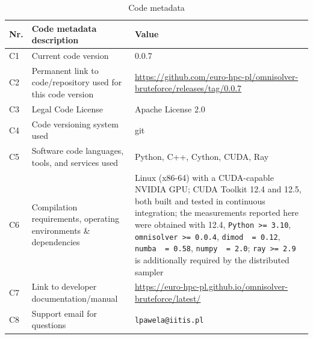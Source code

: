 \documentclass[12pt,a4paper]{elsarticle}
\newcommand{\cudameas}{12.4}
\begin{document}
\begin{table}[H]
\setlength{\tabcolsep}{4pt}
\begin{tabular}{|l|p{5.6cm}|p{6.4cm}|}
\hline
\textbf{Nr.} & \textbf{Code metadata description} & \textbf{Value} \\
\hline
C1 & Current code version & 0.0.7 \\
\hline
C2 & Permanent link to code/repository used for this code version &
\url{https://github.com/euro-hpc-pl/omnisolver-bruteforce/releases/tag/0.0.7} \\
\hline
C3 & Legal Code License & Apache License 2.0 \\
\hline
C4 & Code versioning system used & git \\
\hline
C5 & Software code languages, tools, and services used & Python, C++, Cython,
CUDA, Ray \\
\hline
C6 & Compilation requirements, operating environments \& dependencies & Linux
(x86-64) with a CUDA-capable NVIDIA GPU; CUDA Toolkit 12.4 and 12.5, both built
and tested in continuous integration; the measurements reported here were
obtained with \cudameas, \texttt{Python >= 3.10}, \texttt{omnisolver >= 0.0.4},
\texttt{dimod ~= 0.12}, \texttt{numba ~= 0.58}, \texttt{numpy ~= 2.0};
\texttt{ray >= 2.9} is additionally required by the distributed sampler \\
\hline
C7 & Link to developer documentation/manual &
\url{https://euro-hpc-pl.github.io/omnisolver-bruteforce/latest/} \\
\hline
C8 & Support email for questions & \verb|lpawela@iitis.pl| \\
\hline
\end{tabular}
\caption{Code metadata}
\label{codeMetadata}
\end{table}
\end{document}

